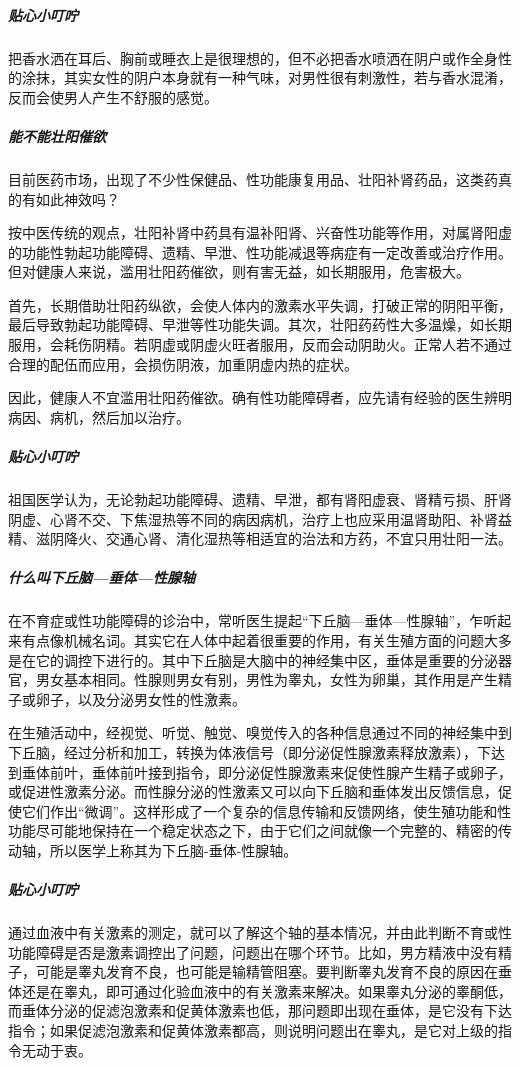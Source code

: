 \subparagraph{贴心小叮咛}

把香水洒在耳后、胸前或睡衣上是很理想的，但不必把香水喷洒在阴户或作全身性的涂抹，其实女性的阴户本身就有一种气味，对男性很有刺激性，若与香水混淆，反而会使男人产生不舒服的感觉。

\subparagraph{能不能壮阳催欲}

目前医药市场，出现了不少性保健品、性功能康复用品、壮阳补肾药品，这类药真的有如此神效吗？

按中医传统的观点，壮阳补肾中药具有温补阳肾、兴奋性功能等作用，对属肾阳虚的功能性勃起功能障碍、遗精、早泄、性功能减退等病症有一定改善或治疗作用。但对健康人来说，滥用壮阳药催欲，则有害无益，如长期服用，危害极大。

首先，长期借助壮阳药纵欲，会使人体内的激素水平失调，打破正常的阴阳平衡，最后导致勃起功能障碍、早泄等性功能失调。其次，壮阳药药性大多温燥，如长期服用，会耗伤阴精。若阴虚或阴虚火旺者服用，反而会动阴助火。正常人若不通过合理的配伍而应用，会损伤阴液，加重阴虚内热的症状。

因此，健康人不宜滥用壮阳药催欲。确有性功能障碍者，应先请有经验的医生辨明病因、病机，然后加以治疗。

\subparagraph{贴心小叮咛}

祖国医学认为，无论勃起功能障碍、遗精、早泄，都有肾阳虚衰、肾精亏损、肝肾阴虚、心肾不交、下焦湿热等不同的病因病机，治疗上也应采用温肾助阳、补肾益精、滋阴降火、交通心肾、清化湿热等相适宜的治法和方药，不宜只用壮阳一法。

\subparagraph{什么叫下丘脑—垂体—性腺轴}

在不育症或性功能障碍的诊治中，常听医生提起“下丘脑—垂体—性腺轴”，乍听起来有点像机械名词。其实它在人体中起着很重要的作用，有关生殖方面的问题大多是在它的调控下进行的。其中下丘脑是大脑中的神经集中区，垂体是重要的分泌器官，男女基本相同。性腺则男女有别，男性为睾丸，女性为卵巢，其作用是产生精子或卵子，以及分泌男女性的性激素。

在生殖活动中，经视觉、听觉、触觉、嗅觉传入的各种信息通过不同的神经集中到下丘脑，经过分析和加工，转换为体液信号（即分泌促性腺激素释放激素），下达到垂体前叶，垂体前叶接到指令，即分泌促性腺激素来促使性腺产生精子或卵子，或促进性激素分泌。而性腺分泌的性激素又可以向下丘脑和垂体发出反馈信息，促使它们作出“微调”。这样形成了一个复杂的信息传输和反馈网络，使生殖功能和性功能尽可能地保持在一个稳定状态之下，由于它们之间就像一个完整的、精密的传动轴，所以医学上称其为下丘脑-垂体-性腺轴。

\subparagraph{贴心小叮咛}

通过血液中有关激素的测定，就可以了解这个轴的基本情况，并由此判断不育或性功能障碍是否是激素调控出了问题，问题出在哪个环节。比如，男方精液中没有精子，可能是睾丸发育不良，也可能是输精管阻塞。要判断睾丸发育不良的原因在垂体还是在睾丸，即可通过化验血液中的有关激素来解决。如果睾丸分泌的睾酮低，而垂体分泌的促滤泡激素和促黄体激素也低，那问题即出现在垂体，是它没有下达指令；如果促滤泡激素和促黄体激素都高，则说明问题出在睾丸，是它对上级的指令无动于衷。

